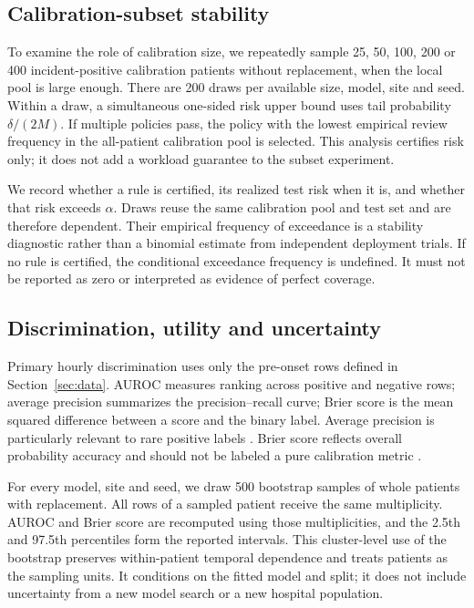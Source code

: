 \subsection{Calibration-subset stability}
To examine the role of calibration size, we repeatedly sample 25, 50, 100, 200 or 400 incident-positive calibration patients without replacement, when the local pool is large enough. There are 200 draws per available size, model, site and seed. Within a draw, a simultaneous one-sided risk upper bound uses tail probability $\delta/(2M)$. If multiple policies pass, the policy with the lowest empirical review frequency in the all-patient calibration pool is selected. This analysis certifies risk only; it does not add a workload guarantee to the subset experiment.

We record whether a rule is certified, its realized test risk when it is, and whether that risk exceeds $\alpha$. Draws reuse the same calibration pool and test set and are therefore dependent. Their empirical frequency of exceedance is a stability diagnostic rather than a binomial estimate from independent deployment trials. If no rule is certified, the conditional exceedance frequency is undefined. It must not be reported as zero or interpreted as evidence of perfect coverage.

\subsection{Discrimination, utility and uncertainty}
Primary hourly discrimination uses only the pre-onset rows defined in Section~\ref{sec:data}. AUROC measures ranking across positive and negative rows; average precision summarizes the precision--recall curve; Brier score is the mean squared difference between a score and the binary label. Average precision is particularly relevant to rare positive labels \citep{saito2015}. Brier score reflects overall probability accuracy and should not be labeled a pure calibration metric \citep{vancalster2019}.

For every model, site and seed, we draw 500 bootstrap samples of whole patients with replacement. All rows of a sampled patient receive the same multiplicity. AUROC and Brier score are recomputed using those multiplicities, and the 2.5th and 97.5th percentiles form the reported intervals. This cluster-level use of the bootstrap \citep{efron1979} preserves within-patient temporal dependence and treats patients as the sampling units. It conditions on the fitted model and split; it does not include uncertainty from a new model search or a new hospital population.

